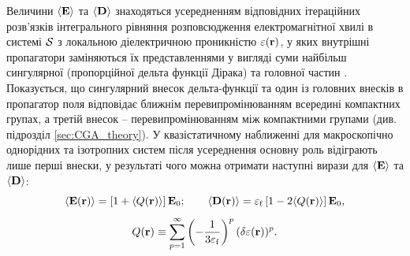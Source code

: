 \documentclass[14pt,twoside]{vakthesis}
\begin{document}
Величини $\langle{{\bf E}}\rangle$ та $\langle{{\bf D}}\rangle$ знаходяться усередненням відповідних ітераційних розв'язків інтегрального  рівняння розповсюдження електромагнітної хвилі в системі $\cal{S}$ з локальною діелектричною проникністю $\varepsilon({\bf r})$, у яких внутрішні пропагатори заміняються їх представленнями у вигляді суми найбільш сингулярної (пропорційної дельта функції Дірака) та головної частин \cite{Sushko2007,Sushko2009}. Показується, що  сингулярний внесок дельта-функції та один із головних внесків в пропагатор поля відповідає ближнім перевипромінюванням всередині компактних групах, а третій внесок -- перевипромінюванням між компактними групами (див. підрозділ \ref{sec:CGA_theory}). У квазістатичному наближенні для  макроскопічно однорідних та ізотропних систем після усереднення основну роль відіграють лише перші внески, у результаті чого    можна отримати наступні вирази для $\langle {\bf E} \rangle$ та $\langle {\bf D} \rangle$:
\begin{equation}\label{eq:ED_average_CGA_origin}
\langle {\bf E} ({\bf r}) \rangle = \left[ 1 + \langle {Q}({\bf r}) \rangle \right] {\bf E}_0;
\qquad
\langle {\bf D} ({\bf r}) \rangle = \varepsilon_{\rm f} \left[ 1 - 2\langle {Q}({\bf r}) \rangle \right] {\bf E}_0,
\end{equation}
\begin{equation}\label{eq:Q_CGA_origin}
{Q}({\bf r}) \equiv \sum\limits_{p=1}^{\infty} \left( - \frac{1}{3{\varepsilon}_{\rm f}} \right)^p (\delta{\varepsilon}({\bf r}))^p.
\end{equation}
\end{document}
